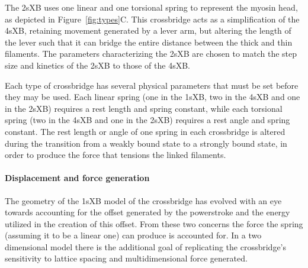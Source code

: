 \documentclass[]{article}
\begin{document}
The 2sXB uses one linear and one torsional spring to represent the myosin head, as depicted in Figure~\ref{fig:types}C.
This crossbridge acts as a simplification of the 4sXB, retaining movement generated by a lever arm, but altering the length of the lever such that it can bridge the entire distance between the thick and thin filaments.
The parameters characterizing the 2sXB are chosen to match the step size and kinetics of the 2sXB to those of the 4sXB.

Each type of crossbridge has several physical parameters that must be set before they may be used.
Each linear spring (one in the 1sXB, two in the 4sXB and one in the 2sXB) requires a rest length and spring constant, while each torsional spring (two in the 4sXB and one in the 2sXB) requires a rest angle and spring constant.
The rest length or angle of one spring in each crossbridge is altered during the transition from a weakly bound state to a strongly bound state, in order to produce the force that tensions the linked filaments.



\paragraph{Displacement and force generation} %
The geometry of the 1sXB model of the crossbridge has evolved with an eye towards accounting for the offset generated by the powerstroke and the energy utilized in the creation of this offset. 
From these two concerns the force the spring (assuming it to be a linear one) can produce is accounted for. 
In a two dimensional model there is the additional goal of replicating the crossbridge's sensitivity to lattice spacing and multidimensional force generated. 
\end{document}

